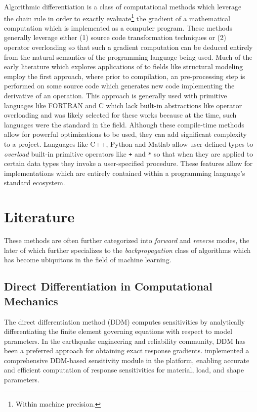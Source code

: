 

Algorithmic differentiation  is a class of computational methods
which leverage the chain rule in order to exactly evaluate\footnote{Within
  machine precision.} the gradient of a mathematical computation which is
implemented as a computer program. 
These methods generally leverage either (1) source code transformation
techniques or (2) operator overloading so that such a gradient
computation can be deduced entirely from the natural semantics of the
programming language being used. 
Much of the early literature which explores applications of \autodiff{} to fields like structural modeling
\autocite{ozaki1995higherorder,martins2001connection} employ the first
approach, where prior to compilation, an pre-processing step is
performed on some source code which generates new code implementing the
derivative of an operation. This approach is generally used with
primitive languages like FORTRAN and C which lack built-in abstractions
like operator overloading and was likely selected for these works
because at the time, such languages were the standard in the field.
Although these compile-time methods allow for powerful optimizations to
be used, they can add significant complexity to a project. 
Languages like C++, Python and Matlab allow user-defined types to \emph{overload}
built-in primitive operators like \texttt{+} and \texttt{*} so that when
they are applied to certain data types they invoke a user-specified
procedure. 
These features allow for \autodiff{} implementations which are
entirely contained within a programming language's standard ecosystem.

\section{Literature}
These methods are often further
categorized into \emph{forward} and \emph{reverse} modes, the later of
which further specializes to the \emph{backpropagation} class of
algorithms which has become ubiquitous in the field of machine learning.

\subsection{Direct Differentiation in
Computational Mechanics}

The direct differentiation method (DDM) computes sensitivities
by analytically differentiating the finite element governing equations
with respect to model parameters. 
In the earthquake engineering and
reliability community, DDM has been a preferred approach for obtaining
exact response gradients. 
\cite{haukaas2003finite} implemented a comprehensive DDM-based sensitivity module in the \OpenSees{} platform, enabling accurate and efficient computation of
response sensitivities for material, load, and shape parameters.

